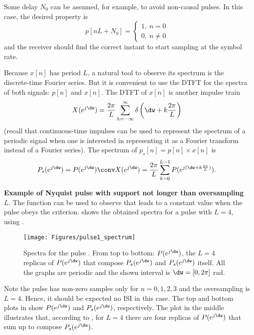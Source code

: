 Some delay $N_0$ can be assumed, for example, to avoid non-causal pulses. In this case, the desired property is
\[
p[n L + N_0] = \left\{ \begin{array}{l} 1,~n = 0 \\ 0,~n \ne 0 \end{array} \right.
\]
and the receiver should find the correct instant to start sampling at the symbol rate.

Because $x[n]$ has period $L$, a natural tool to observe its spectrum is the discrete-time Fourier series. But it is convenient to use the DTFT for the spectra of both signals: $p[n]$ and $x[n]$. The DTFT of $x[n]$ is another impulse train
\[
X(e^{j\dw})=\frac{2 \pi}{L}  \sum_{k=-\infty}^{\infty} \delta\left(\dw+k \frac{2 \pi}{L}\right)
\]
(recall that continuous-time impulses can be used to represent the spectrum of a periodic signal when one is interested in representing it as a Fourier transform instead of a Fourier series).
The spectrum of $p_s[n] = p[n] \times x[n]$ is
\begin{equation}
P_s(e^{j\dw})=  P(e^{j\dw}) \conv X(e^{j\dw}) = \frac{2 \pi}{L}  \sum_{k=0}^{L-1} P(e^{j(\dw+k \frac{2 \pi}{L})}).
\label{eq:nyq_criterion}
\end{equation}

\bExample \textbf{Example of Nyquist pulse with support not longer than oversampling $L$}.
The function  can be used to observe that  leads to a constant value when the pulse obeys the criterion.  shows the obtained spectra for a pulse  with $L=4$, using .

\begin{figure}[htbp]
\centering
\texttt{[image: Figures/pulse1\_spectrum]}
\caption[Spectra for the pulse .]{Spectra for the pulse . From top to bottom: $P(e^{j\dw})$, the $L=4$ replicas of $P(e^{j\dw})$ that compose $P_s(e^{j\dw})$ and $P_s(e^{j\dw})$ itself. All the graphs are periodic and the shown interval is $\dw=[0,2 \pi]$ rad. \label{fig:pulse1_spectrum}}
\end{figure}

Note the pulse has non-zero samples only for $n=0,1,2,3$ and the oversampling is $L=4$. Hence, it should be expected no ISI in this case. The top and bottom plots in  show $P(e^{j\dw})$ and $P_s(e^{j\dw})$, respectively. The plot in the middle illustrates that, according to , for $L=4$ there are four replicas of $P(e^{j\dw})$ that sum up to compose $P_s(e^{j\dw})$.

